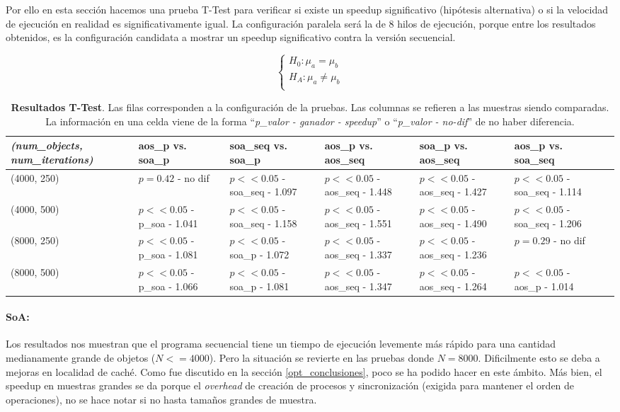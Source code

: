 \documentclass{article}
\begin{document}
Por ello en esta sección hacemos una prueba T-Test para
verificar si existe un speedup significativo (hipótesis alternativa) o si la velocidad de ejecución en realidad
es significativamente igual. La configuración paralela será la de 8 hilos de ejecución, porque entre los resultados
obtenidos, es la configuración candidata a mostrar un speedup significativo contra la versión secuencial.

\begin{displaymath}
\begin{cases}
	{H_0}: \mu_a = \mu_b\\
	{H_A}: \mu_a \neq \mu_b\\
\end{cases}
\end{displaymath}

\begin{table}[htp]
\begin{tabular}{|p{3cm}|p{2.2cm}|p{2.2cm}|p{2.2cm}|p{2.2cm}|p{2.2cm}|p{2.2cm}|}
	\hline
	\textit{(num\_objects, num\_iterations)} & aos\_p vs. soa\_p & soa\_seq vs. soa\_p & aos\_p vs. aos\_seq & soa\_p vs. aos\_seq & aos\_p vs. soa\_seq \\
	\hline
	(4000, 250) & $p = 0.42$ - no dif & $p << 0.05$ - soa\_seq - 1.097 & $p << 0.05$ - aos\_seq - 1.448 & $p << 0.05$ - aos\_seq - 1.427 & $p << 0.05$ - soa\_seq - 1.114\\
	\hline
	(4000, 500) & $p << 0.05$ - p\_soa - 1.041 & $p << 0.05$ - soa\_seq - 1.158 & $p << 0.05$ - aos\_seq - 1.551 & $p << 0.05$ - aos\_seq - 1.490 & $p << 0.05$ - soa\_seq - 1.206\\
	\hline
	(8000, 250) & $p << 0.05$ - p\_soa - 1.081 & $p << 0.05$ - soa\_p - 1.072 & $p << 0.05$ - aos\_seq - 1.337 & $p << 0.05$ - aos\_seq - 1.236 & $p = 0.29$ - no dif\\
	\hline
	(8000, 500) & $p << 0.05$ - p\_soa - 1.066 & $p << 0.05$ - soa\_p - 1.081 & $p << 0.05$ - aos\_seq - 1.347 & $p << 0.05$ - aos\_seq - 1.264 & $p << 0.05$ - aos\_p - 1.014\\
	\hline
\end{tabular}
	\caption{\textbf{Resultados T-Test}. Las filas corresponden a la configuración de la pruebas. Las columnas se refieren a las muestras siendo comparadas.
	La información en una celda viene de la forma ``\textit{p\_valor - ganador - speedup}'' o ``\textit{p\_valor - no-dif}'' de no haber diferencia.}
\end{table}

\paragraph{SoA:}
Los resultados nos muestran que el programa secuencial tiene un tiempo de ejecución levemente más rápido
para una cantidad medianamente grande de objetos (${N} <= 4000$). Pero la situación se revierte
en las pruebas donde ${N} = 8000$. Dificilmente esto se deba a mejoras en localidad de caché.
Como fue discutido en la sección \ref{opt_conclusiones}, poco se ha podido hacer en este ámbito.
Más bien, el speedup en muestras grandes se da porque el \textit{overhead} de creación
de procesos y sincronización (exigida para mantener el orden de operaciones), no se hace notar
si no hasta tamaños grandes de muestra.
\end{document}
